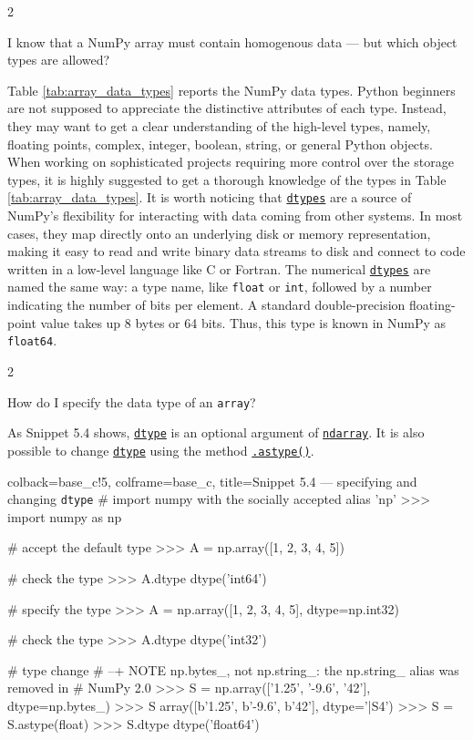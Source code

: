 \documentclass[a4paper,11pt]{book}
\newcommand{\question}[1]{%
    \begin{tcolorbox}[colback=comp_c!10,colframe=comp_c,sidebyside align=top,width=\linewidth,before skip=1ex]
        #1
    \end{tcolorbox}
    \switchcolumn%
}
\newcommand{\note}[1]{%
    \begin{tcolorbox}[colback=white!0,colframe=white!10,width=\linewidth,before skip=1ex]
        #1
    \end{tcolorbox}
}
\begin{document}
\begin{paracol}{2}
	\question{\raggedright I know that a NumPy array must contain homogenous data --- but which object types are allowed?}
	\note{Table \ref{tab:array_data_types} reports the NumPy data types. Python beginners are not supposed to appreciate the distinctive attributes of each type. Instead, they may want to get a clear understanding of the high-level types, namely, floating points, complex, integer, boolean, string, or general Python objects. When working on sophisticated projects requiring more control over the storage types, it is highly suggested to get a thorough knowledge of the types in Table \ref{tab:array_data_types}. It is worth noticing that \href{https://numpy.org/doc/stable/reference/generated/numpy.ndarray.dtype.html}{\texttt{dtypes}} are a source of NumPy's flexibility for interacting with data coming from other systems. In most cases, they map directly onto an underlying disk or memory representation, making it easy to read and write binary data streams to disk and connect to code written in a low-level language like C or Fortran. The numerical \href{https://numpy.org/doc/stable/reference/generated/numpy.ndarray.dtype.html}{\texttt{dtypes}} are named the same way: a type name, like \texttt{float} or \texttt{int}, followed by a number indicating the number of bits per element. A standard double-precision floating-point value takes up 8 bytes or 64 bits. Thus, this type is known in NumPy as \texttt{float64}.}
\end{paracol}

\begin{paracol}{2}
	\question{\raggedright How do I specify the data type of an \texttt{array}?}
	\note{As Snippet 5.4 shows, \href{https://numpy.org/doc/stable/reference/generated/numpy.ndarray.dtype.html}{\texttt{dtype}} is an optional argument of \href{https://numpy.org/doc/stable/reference/generated/numpy.ndarray.html}{\texttt{ndarray}}. It is also possible to change \href{https://numpy.org/doc/stable/reference/generated/numpy.ndarray.dtype.html}{\texttt{dtype}} using the method \href{https://numpy.org/doc/stable/reference/generated/numpy.ndarray.astype.html}{\texttt{.astype()}}.}
\end{paracol}

\begin{pythoncode}[linenos=true,]{colback=base_c!5, colframe=base_c, title=\sffamily Snippet 5.4 --- specifying and changing \texttt{dtype}}
# import numpy with the socially accepted alias 'np'
>>> import numpy as np

# accept the default type
>>> A = np.array([1, 2, 3, 4, 5])

# check the type
>>> A.dtype
dtype('int64')

# specify the type
>>> A = np.array([1, 2, 3, 4, 5], dtype=np.int32)

# check the type
>>> A.dtype
dtype('int32')

# type change
# --+ NOTE np.bytes_, not np.string_: the np.string_ alias was removed in
#     NumPy 2.0
>>> S = np.array(['1.25', '-9.6', '42'], dtype=np.bytes_)
>>> S
array([b'1.25', b'-9.6', b'42'], dtype='|S4')
>>> S = S.astype(float)
>>> S.dtype
dtype('float64')
\end{pythoncode}
\end{document}
